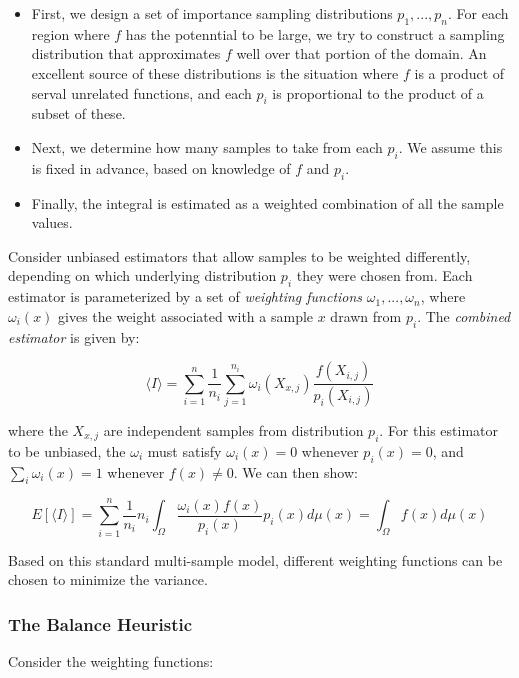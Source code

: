 \begin{itemize}
	\item First, we design a set of importance sampling distributions $p_1,...,p_n$. For each region where $f$ has the potenntial to be large, we try to construct a sampling distribution that approximates $f$ well over that portion of the domain. An excellent source of these distributions is the situation where $f$ is a product of serval unrelated functions, and each $p_i$ is proportional to the product of a subset of these.
	\item Next, we determine how many samples to take from each $p_i$. We assume this is fixed in advance, based on knowledge of $f$ and $p_i$.
	\item Finally, the integral is estimated as a weighted combination of all the sample values. 
\end{itemize}

Consider unbiased estimators that allow samples to be weighted differently, depending on which underlying distribution $p_i$ they were chosen from. Each estimator is parameterized by a set of \textit{weighting functions} $\omega_1,...,\omega_n$, where $\omega_i(x)$ gives the weight associated with a sample $x$ drawn from $p_i$. The \textit{combined estimator} is given by:

\begin{equation}\label{e:combined-estimator}
	\langle I \rangle=\sum_{i=1}^{n}\frac{1}{n_i}\sum_{j=1}^{n_i}\omega_i(X_{x,j})\frac{f(X_{i,j})}{p_i(X_{i,j})}
\end{equation}

where the $X_{x,j}$ are independent samples from distribution $p_i$. For this estimator to be unbiased, the $\omega_i$ must satisfy $\omega_i(x)=0$ whenever $p_i(x)=0$, and $\sum_{i}\omega_i(x)=1$ whenever $f(x)\neq 0$. We can then show:

\begin{equation}
	E[\langle I\rangle]=\sum_{i=1}^{n}\frac{1}{n_i}n_i\int_{\Omega}\frac{\omega_i(x)f(x)}{p_i(x)}p_i(x)d\mu (x)=\int_{\Omega}f(x)d\mu (x)
\end{equation}

Based on this standard multi-sample model, different weighting functions can be chosen to minimize the variance.


\subsubsection{The Balance Heuristic}
Consider the weighting functions:

